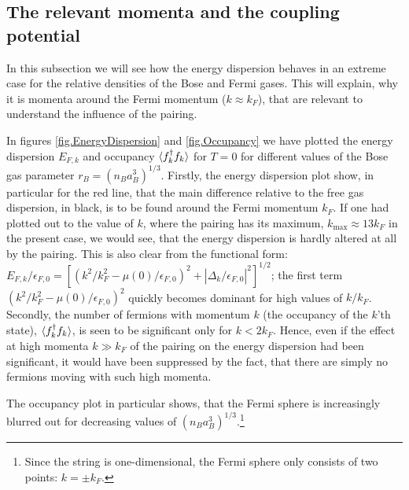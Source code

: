 \subsection{The relevant momenta and the coupling potential}
In this subsection we will see how the energy dispersion behaves in an extreme case for the relative densities of the Bose and Fermi gases. This will explain, why it is momenta around the Fermi momentum ($k \approx k_F$), that are relevant to understand the influence of the pairing. 

In figures \ref{fig.EnergyDispersion} and \ref{fig.Occupancy} we have plotted the energy dispersion $E_{F,k}$ and occupancy $\braket{f_k^\dagger f_k}$ for $T = 0$ for different values of the Bose gas parameter $r_B = (n_Ba_B^3)^{1/3}$. Firstly, the energy dispersion plot show, in particular for the red line, that the main difference relative to the free gas dispersion, in black, is to be found around the Fermi momentum $k_F$. If one had plotted out to the value of $k$, where the pairing has its maximum, $k_{\max} \approx 13 k_F$ in the present case, we would see, that the energy dispersion is hardly altered at all by the pairing. This is also clear from the functional form: $E_{F,k}/\epsilon_{F,0} = [(k^2/k_F^2 - \mu(0)/\epsilon_{F,0})^2 + |\Delta_k/\epsilon_{F,0}|^2 ]^{1/2}$; the first term $(k^2/k_F^2 - \mu(0)/\epsilon_{F,0})^2$ quickly becomes dominant for high values of $k/k_F$. Secondly, the number of fermions with momentum $k$ (the occupancy of the $k$'th state), $\braket{f_k^\dagger f_k}$, is seen to be significant only for $k < 2k_F$. Hence, even if the effect at high momenta $k \gg k_F$ of the pairing on the energy dispersion had been significant, it would have been suppressed by the fact, that there are simply no fermions moving with such high momenta.

The occupancy plot in particular shows, that the Fermi sphere is increasingly blurred out for decreasing values of $(n_Ba_B^3)^{1/3}$.\footnote{Since the string is one-dimensional, the Fermi sphere only consists of two points: $k = \pm k_F$.} 

